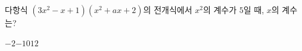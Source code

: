 다항식 $(3x^2-x+1)(x^2+ax+2)$의 전개식에서 $x^2$의 계수가 $5$일 때, $x$의 계수는? 
\begin{choices32}{$-2$}{$-1$}{$0$}{$1$}{$2$}\end{choices32}
